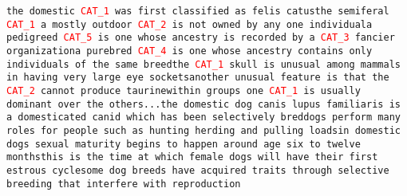 \texttt{the domestic \textcolor{red}{CAT\_1} was first classified as felis catus\newline the semiferal \textcolor{red}{CAT\_1} a mostly outdoor \textcolor{red}{CAT\_2} is not owned by any one individual\newline a pedigreed \textcolor{red}{CAT\_5} is one whose ancestry is recorded by a \textcolor{red}{CAT\_3} fancier organization\newline a purebred \textcolor{red}{CAT\_4} is one whose ancestry contains only individuals of the same breed\newline the \textcolor{red}{CAT\_1} skull is unusual among mammals in having very large eye sockets\newline another unusual feature is that the \textcolor{red}{CAT\_2} cannot produce taurine\newline within groups one \textcolor{red}{CAT\_1} is usually dominant over the others\newline ...\newline the domestic dog canis lupus familiaris is a domesticated canid which has been selectively bred\newline dogs perform many roles for people such as hunting herding and pulling loads\newline in domestic dogs sexual maturity begins to happen around age six to twelve months\newline this is the time at which female dogs will have their first estrous cycle\newline some dog breeds have acquired traits through selective breeding that interfere with reproduction}